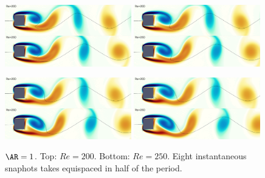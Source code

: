 \begin{figure}
  \includegraphics[width=0.49\textwidth]{./fig/AR1/snap/snap.0030.png}
  \includegraphics[width=0.49\textwidth]{./fig/AR1/snap/snap.0035.png}
  \includegraphics[width=0.49\textwidth]{./fig/AR1/snap/snap.0040.png}
  \includegraphics[width=0.49\textwidth]{./fig/AR1/snap/snap.0045.png}  
  \caption{$\AR=1$. Top: $Re=200$. Bottom: $Re=250$. Eight instantaneous snaphots takes equispaced in half of the period.}
\end{figure}      


